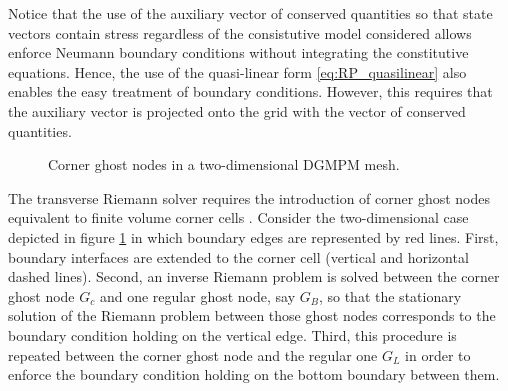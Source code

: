 Notice that the use of the auxiliary vector of conserved quantities so that state vectors contain stress regardless of the consistutive model considered allows enforce Neumann boundary conditions without integrating the constitutive equations. Hence, the use of the quasi-linear form \eqref{eq:RP_quasilinear} also enables the easy treatment of boundary conditions. However, this requires that the auxiliary vector is projected onto the grid with the vector of conserved quantities.

\begin{figure}[ht]
  \centering
  \caption{Corner ghost nodes in a two-dimensional DGMPM mesh.}
  \label{fig:corner_ghost}
\end{figure}

The transverse Riemann solver requires the introduction of corner ghost nodes equivalent to finite volume corner cells \cite{Leveque}. Consider the two-dimensional case depicted in figure \ref{fig:corner_ghost} in which boundary edges are represented by red lines. First, boundary interfaces are extended to the corner cell (vertical and horizontal dashed lines). Second, an inverse Riemann problem is solved between the corner ghost node $G_c$ and one regular ghost node, say $G_B$, so that the stationary solution of the Riemann problem between those ghost nodes corresponds to the boundary condition holding on the vertical edge. Third, this procedure is repeated between the corner ghost node and the regular one $G_L$ in order to enforce the boundary condition holding on the bottom boundary between them. 




